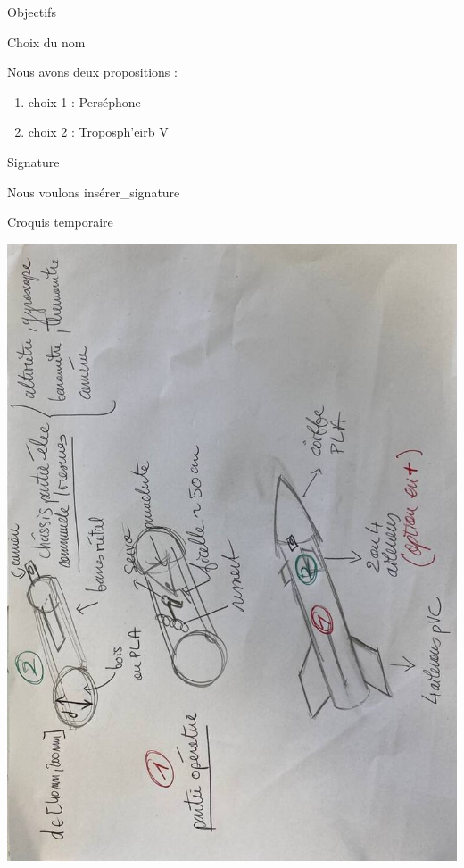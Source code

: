 \documentclass{beamer}
\begin{document}
	\begin{frame}{Objectifs}

		\begin{block}{Choix du nom}

			Nous avons deux propositions :
			\begin{enumerate}
				
				\item choix 1 : Perséphone
				\item choix 2 : Troposph'eirb V
			\end{enumerate}
		\end{block}
		
		


		\begin{block}{Signature}

			Nous voulons insérer\_signature
		\end{block}
		
	\end{frame}


	\begin{frame}{Croquis temporaire}
		
		\begin{center}

			\includegraphics[width=0.6\linewidth,angle=270]{pics/5855222429968874941_121.jpg}
		 \end{center}
	\end{frame}
	
\end{document}
